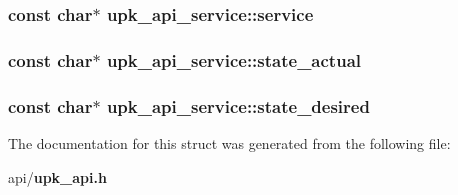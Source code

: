 \subsubsection{\setlength{\rightskip}{0pt plus 5cm}const char$\ast$ \bf{upk\_\-api\_\-service::service}}\label{structupk__api__service_1a4c4f245b65dffc597a04a7d15c1cac}


\subsubsection{\setlength{\rightskip}{0pt plus 5cm}const char$\ast$ \bf{upk\_\-api\_\-service::state\_\-actual}}\label{structupk__api__service_ae6e0694f198266fd622db99a49df2aa}


\subsubsection{\setlength{\rightskip}{0pt plus 5cm}const char$\ast$ \bf{upk\_\-api\_\-service::state\_\-desired}}\label{structupk__api__service_c860edb8c12e852e29b842dd4e91ba60}




The documentation for this struct was generated from the following file:\begin{CompactItemize}
\item 
api/\bf{upk\_\-api.h}\end{CompactItemize}
